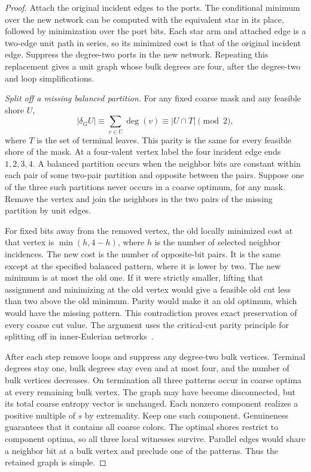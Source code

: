 \documentclass[11pt]{article}
\begin{document}
\begin{proof}
Attach the original incident edges to the ports. The conditional
minimum over the new network can be computed with the equivalent
star in its place, followed by minimization over the port bits.
Each star arm and attached edge is a two-edge unit path in series,
so its minimized cost is that of the original incident edge.
Suppress the degree-two ports in the new network. Repeating this
replacement gives a unit graph whose bulk degrees are four, after
the degree-two and loop simplifications.

\emph{Split off a missing balanced partition.}
For any fixed coarse mask and any feasible shore \(U\),
\[
 |\delta_G U|\equiv \sum_{v\in U}\deg(v)
 \equiv |U\cap T|\pmod 2,
\]
where \(T\) is the set of terminal leaves. This parity is the same
for every feasible shore of the mask. At a four-valent vertex
label the four incident edge ends \(1,2,3,4\). A balanced partition
occurs when the neighbor bits are constant within each pair of
some two-pair partition and opposite between the pairs. Suppose
one of the three such partitions never occurs in a coarse optimum,
for any mask. Remove the vertex and join the neighbors in the
two pairs of the missing partition by unit edges.

For fixed bits away from the removed vertex, the old locally
minimized cost at that vertex is \(\min(h,4-h)\), where \(h\) is
the number of selected neighbor incidences. The new cost is the
number of opposite-bit pairs. It is the same except at the
specified balanced pattern, where it is lower by two. The new
minimum is at most the old one. If it were strictly smaller,
lifting that assignment and minimizing at the old vertex would
give a feasible old cut less than two above the old minimum.
Parity would make it an old optimum, which would have the
missing pattern. This contradiction proves exact preservation
of every coarse cut value. The argument uses the critical-cut
parity principle for splitting off in inner-Eulerian
networks~\cite{hirai2010}.

After each step remove loops and suppress any degree-two bulk
vertices. Terminal degrees stay one, bulk degrees stay even and
at most four, and the number of bulk vertices decreases. On
termination all three patterns occur in coarse optima at every
remaining bulk vertex. The graph may have become disconnected,
but its total coarse entropy vector is unchanged. Each nonzero
component realizes a positive multiple of \(s\) by extremality.
Keep one such component. Genuineness guarantees that it contains
all coarse colors. The optimal shores restrict to component
optima, so all three local witnesses survive. Parallel edges
would share a neighbor bit at a bulk vertex and preclude one of
the patterns. Thus the retained graph is simple.


\end{proof}
\end{document}
